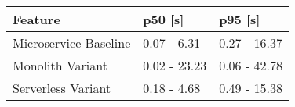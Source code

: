 \begin{tabular}{lll}
\toprule
Feature & p50 [s] & p95 [s] \\
\midrule
Microservice Baseline & 0.07 - 6.31 & 0.27 - 16.37 \\
Monolith Variant & 0.02 - 23.23 & 0.06 - 42.78 \\
Serverless Variant & 0.18 - 4.68 & 0.49 - 15.38 \\
\bottomrule
\end{tabular}
